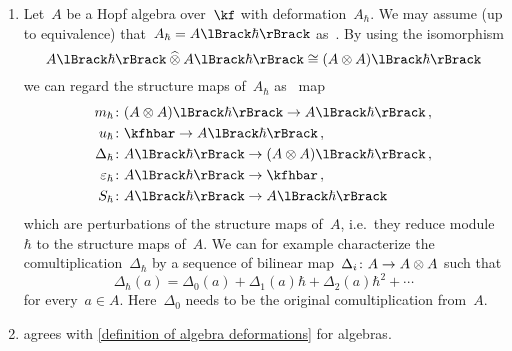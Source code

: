 \documentclass[a4paper, 11pt, oneside]{scrartcl}
\begin{document}
\begin{remark}
  \leavevmode
  \begin{enumerate}
    \item
      Let~$A$ be a Hopf algebra over~$\kf$ with deformation~$A_{\hbar}$.
      We may assume (up to equivalence) that~$A_{\hbar} = \power{A}{\hbar}$ as~\modules{$\kfhbar$}.
      By using the isomorphism
      \[
        \power{A}{\hbar} \ctensor \power{A}{\hbar}
        \cong
        \power{(A \tensor A)}{\hbar}
      \]
      we can regard the structure maps of~$A_{\hbar}$ as~\linear{$\kfhbar$} map
      \begin{equation}
        \label{explicit description of deformed hopf algebra}
        \begin{aligned}
          m_{\hbar} &\colon \power{(A \tensor A)}{\hbar} \to \power{A}{\hbar} \,,
          \\
          u_{\hbar} &\colon \kfhbar \to \power{A}{\hbar} \,,
          \\
          \Delta_{\hbar} &\colon \power{A}{\hbar} \to \power{(A \tensor A)}{\hbar} \,,
          \\
          \varepsilon_{\hbar} &\colon \power{A}{\hbar} \to \kfhbar \,,
          \\
          S_{\hbar} &\colon \power{A}{\hbar} \to \power{A}{\hbar}
        \end{aligned}
      \end{equation}
      which are perturbations of the structure maps of~$A$, i.e.\ they reduce module~$\hbar$ to the structure maps of~$A$.
      We can for example characterize the comultiplication~$\Delta_{\hbar}$ by a sequence of bilinear map~$\Delta_i \colon A \to A \otimes A$ such that
      \[
        \Delta_{\hbar}(a)
        =
        \Delta_0(a) + \Delta_1(a) \hbar + \Delta_2(a) \hbar^2 + \dotsb
      \]
      for every~$a \in A$.
      Here~$\Delta_0$ needs to be the original comultiplication from~$A$.
    \item
       agrees with \cref{definition of algebra deformations} for algebras.
  \end{enumerate}
\end{remark}
\end{document}
